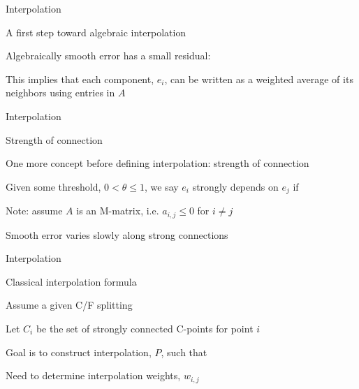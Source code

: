 \documentclass[18pt,xcolor=table]{beamer}
\begin{document}
\begin{frame}{Interpolation}
\begin{block}{A first step toward algebraic interpolation}
\bit
\item Algebraically smooth error has a small residual:
\item This implies that each component, $e_i$, can be written as a weighted average of its neighbors using entries in $A$
\eit
\end{block}
\end{frame}

\begin{frame}{Interpolation}
\begin{block}{Strength of connection}
\bit
\item One more concept before defining interpolation: strength of connection
\item Given some threshold, $0 < \theta \leq 1$, we say $e_i$ strongly depends on $e_j$ if
\item Note: assume $A$ is an M-matrix, i.e. $a_{i,j}\leq 0$ for $i\neq j$
\item Smooth error varies slowly along strong connections 
\eit
\end{block}
\end{frame}

\begin{frame}{Interpolation}
\begin{block}{Classical interpolation formula}
\bit
\item Assume a given C/F splitting
\item Let $C_i$ be the set of strongly connected C-points for point $i$
\item Goal is to construct interpolation, $P$, such that
\item Need to determine interpolation weights, $w_{i,j}$
\eit
\end{block}
\end{frame}
\end{document}
